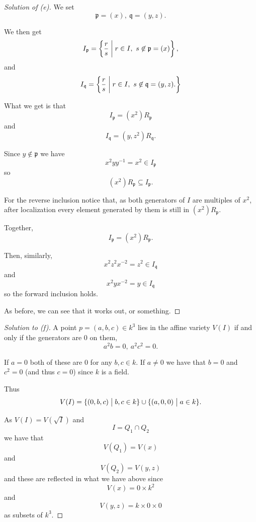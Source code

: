 \documentclass[11pt]{article}
\begin{document}
\begin{proof}[Solution of (e)]
    We set 
    \[
        \mathfrak p = (x), \ \mathfrak q = (y,z). 
    \]

    We then get 
    \[
        I_{\mathfrak p} 
        = 
        \left\{
            \frac{r}{s} \biggm| 
            r \in I, \ s \not\in \mathfrak p 
            = (x)
        \right\},
    \]
    and 
    \[
        I_{\mathfrak q} 
        = 
        \left\{
            \frac{r}s \biggm| 
            r \in I, \ s \not\in \mathfrak q 
            = (y,z). 
        \right\}  
    \]

    What we get is that 
    \[
        I_{\mathfrak p} 
        = (x^2)R_{\mathfrak p} 
    \]
    and 
    \[
        I_{\mathfrak q} 
        = (y,z^2)R_{\mathfrak q}. 
    \]

    Since $y\not\in \mathfrak p$ we have 
    \[
        x^2yy^{-1} = x^2 \in I_{\mathfrak p} 
    \]
    so 
    \[
        (x^2)R_{\mathfrak p} \subseteq I_{\mathfrak p}. 
    \]

    For the reverse inclusion 
    notice that, as both generators 
    of $I$ are multiples of $x^2$, 
    after localization every element generated 
    by them is still in $(x^2)R_{\mathfrak p}$. 

    Together, 
    \[
        I_{\mathfrak p} = (x^2)R_{\mathfrak p}. 
    \]

    Then, similarly, 
    \[
        x^2z^2x^{-2} = z^2 \in I_{\mathfrak q}        
    \]
    and 
    \[
        x^{2}yx^{-2} = y \in I_{\mathfrak q}
    \]
    so the forward inclusion holds. 

    As before, we can see that it works out, or something. 

\end{proof}
\begin{proof}[Solution to (f)]
    A point $p = (a,b,c) \in k^3$ lies 
    in the affine variety $V(I)$ if and only 
    if the generators are $0$ on them,
    \[
        a^2b = 0, \ a^2c^2 = 0. 
    \]

    If $a = 0$ both of these are $0$ for 
    any $b,c \in k$. 
    If $a \neq 0$ we have that 
    $b = 0$ and $c^2 = 0$ (and thus $c=0$) since 
    $k$ is a field. 

    Thus 
    \[
        V(I) = \{(0,b,c) \bigm| b,c \in k\} 
        \cup \{(a,0,0) \bigm| a \in k\}. 
    \]

    As $V(I) = V(\sqrt I)$ and 
    \[
        I = Q_1 \cap Q_2 
    \]
    we have that 
    \[
        V(Q_1) = V(x)
    \]
    and 
    \[
        V(Q_2) = V(y,z) 
    \]
    and these are reflected in what 
    we have above since 
    \[
        V(x) = 0 \times k^2 
    \]
    and 
    \[
        V(y,z) = k \times 0 \times 0 
    \]
    as subsets of $k^3$. 
\end{proof}
\end{document}
